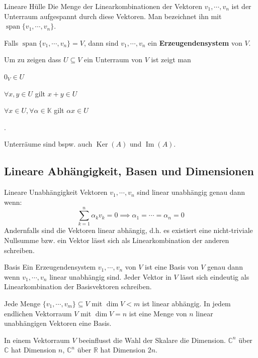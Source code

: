 \documentclass[a4paper,10pt]{article}
\DeclareMathOperator{\Image}{Im}
\DeclareMathOperator{\Kernel}{Ker}
\DeclareMathOperator{\Span}{span}
\def\R{\mathbb{R}}
\def\C{\mathbb{C}}
\def\K{\mathbb{K}}
\begin{document}
\begin{subbox}{Lineare Hülle}
  Die Menge der Linearkombinationen der Vektoren $v_1, \cdots, v_n$ ist der Unterraum aufgespannt durch diese Vektoren. Man bezeichnet ihn mit $\Span \{ v_1, \cdots, v_n \}$.
\end{subbox}

Falls $\Span \{v_1, \cdots, v_n\} = V$, dann sind $v_1, \cdots, v_n$ ein \textbf{Erzeugendensystem} von $V$.

Um zu zeigen dass $U \subseteq V$ ein Unterraum von $V$ ist zeigt man 
\begin{rowlist}
  \item $0_V \in U$
  \item $\forall x, y \in U$ gilt $x + y \in U$
  \item $\forall x \in U, \forall \alpha \in \K$ gilt $\alpha x \in U$
\end{rowlist}.

Unterräume sind bspw. auch $\Kernel(A)$ und $\Image(A)$.

\subsection{Lineare Abhängigkeit, Basen und Dimensionen}

\begin{mainbox}{Lineare Unabhängigkeit}
  Vektoren $v_1, \cdots, v_n$ sind linear unabhängig genau dann wenn:
  $$\sum_{k=1}^n \alpha_k v_k = 0 \implies \alpha_1 = \cdots = \alpha_n = 0$$
  Andernfalls sind die Vektoren linear abhängig, d.h. es existiert eine nicht-triviale Nullsumme bzw. ein Vektor lässt sich als Linearkombination der anderen schreiben.
\end{mainbox}

\begin{mainbox}{Basis}
  Ein Erzeugendensystem $v_1, \cdots, v_n$ von $V$ ist eine Basis von $V$ genau dann wenn $v_1, \cdots, v_n$ linear unabhängig sind. Jeder Vektor in $V$ lässt sich eindeutig als Linearkombination der Basisvektoren schreiben.
\end{mainbox}

Jede Menge $\{v_1, \cdots, v_m\} \subseteq V$ mit $\dim V < m$ ist linear abhängig. In jedem endlichen Vektorraum $V$ mit $\dim V = n$ ist eine Menge von $n$ linear unabhängigen Vektoren eine Basis.

In einem Vektorraum $V$ beeinflusst die Wahl der Skalare die Dimension. $\C^n$ über $\C$ hat Dimension $n$, $\C^n$ über $\R$ hat Dimension $2n$.
\end{document}

